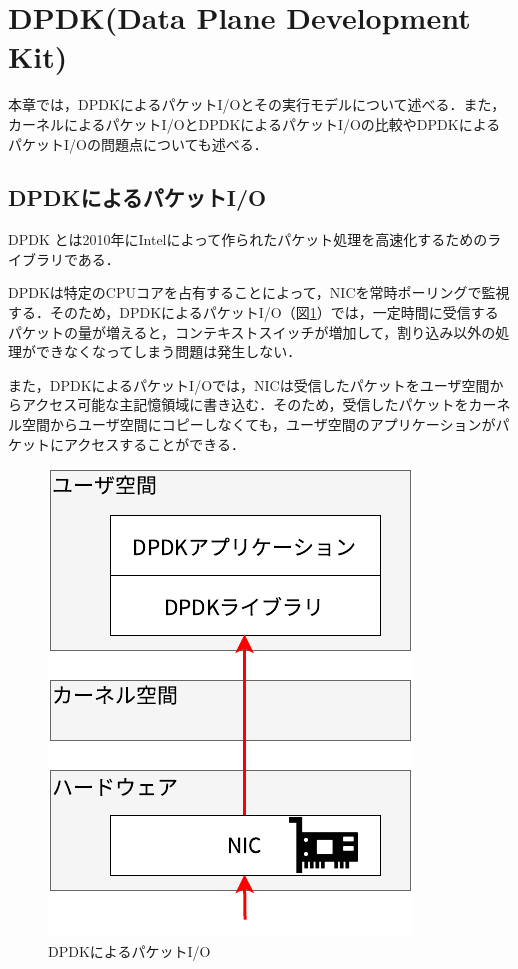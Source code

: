 \section{DPDK(Data Plane Development Kit)}
\label{sec:DPDK}
本章では，DPDKによるパケットI/Oとその実行モデルについて述べる．また，カーネルによるパケットI/OとDPDKによるパケットI/Oの比較やDPDKによるパケットI/Oの問題点についても述べる．

\subsection{DPDKによるパケットI/O}
DPDK \cite{DPDK} とは2010年にIntelによって作られたパケット処理を高速化するためのライブラリである．

DPDKは特定のCPUコアを占有することによって，NICを常時ポーリングで監視する．そのため，DPDKによるパケットI/O（図\ref{fig:DPDKPacketIO}）では，一定時間に受信するパケットの量が増えると，コンテキストスイッチが増加して，割り込み以外の処理ができなくなってしまう問題は発生しない．

また，DPDKによるパケットI/Oでは，NICは受信したパケットをユーザ空間からアクセス可能な主記憶領域に書き込む．そのため，受信したパケットをカーネル空間からユーザ空間にコピーしなくても，ユーザ空間のアプリケーションがパケットにアクセスすることができる．

\begin{figure}[htb]
  \centering
  \includegraphics[width=0.5\columnwidth]{pictures/DPDKPacketIO.pdf}
  \caption{DPDKによるパケットI/O}
  \label{fig:DPDKPacketIO}
\end{figure}

